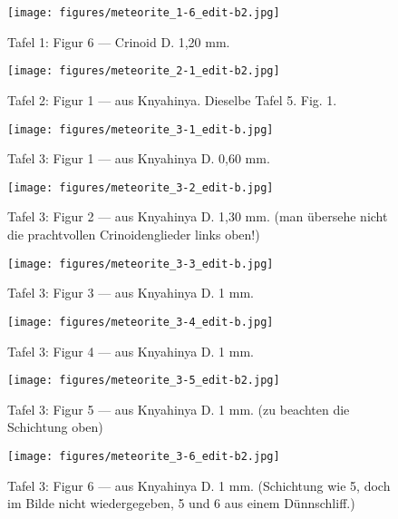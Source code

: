 \documentclass[a4paper, 12pt, oneside]{article}
\begin{document}
\clearpage
\begin{figure}[t]
\texttt{[image: figures/meteorite\_1-6\_edit-b2.jpg]}
\caption{Tafel 1: Figur 6 --- Crinoid D. 1,20 mm.}
\centering
\end{figure}
\clearpage
{}
\begin{figure}[t]
\texttt{[image: figures/meteorite\_2-1\_edit-b2.jpg]}
\caption{Tafel 2: Figur 1 --- aus Knyahinya. Dieselbe Tafel 5. Fig. 1.}
\centering
\end{figure}
\clearpage
{}
\begin{figure}[t]
\texttt{[image: figures/meteorite\_3-1\_edit-b.jpg]}
\caption{Tafel 3: Figur 1 --- aus Knyahinya D. 0,60 mm.}
\centering
\end{figure}
\clearpage
\begin{figure}[t]
\texttt{[image: figures/meteorite\_3-2\_edit-b.jpg]}
\caption{Tafel 3: Figur 2 --- aus Knyahinya D. 1,30 mm. (man übersehe nicht die prachtvollen Crinoidenglieder links oben!)}
\centering
\end{figure}
\clearpage
\begin{figure}[t]
\texttt{[image: figures/meteorite\_3-3\_edit-b.jpg]}
\caption{Tafel 3: Figur 3 --- aus Knyahinya D. 1 mm.}
\centering
\end{figure}
\clearpage
\begin{figure}[t]
\texttt{[image: figures/meteorite\_3-4\_edit-b.jpg]}
\caption{Tafel 3: Figur 4 --- aus Knyahinya D. 1 mm.}
\centering
\end{figure}
\clearpage
\begin{figure}[t]
\texttt{[image: figures/meteorite\_3-5\_edit-b2.jpg]}
\caption{Tafel 3: Figur 5 --- aus Knyahinya D. 1 mm. (zu beachten die Schichtung oben)}
\centering
\end{figure}
\clearpage
\begin{figure}[t]
\texttt{[image: figures/meteorite\_3-6\_edit-b2.jpg]}
\caption{Tafel 3: Figur 6 --- aus Knyahinya D. 1 mm. (Schichtung wie 5, doch im Bilde nicht wiedergegeben, 5 und 6 aus einem Dünnschliff.)}
\centering
\end{figure}
\end{document}
